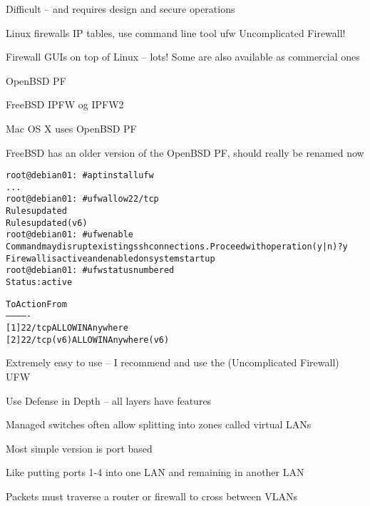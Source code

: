 \documentclass[Screen16to9,17pt]{foils}
\begin{document}
\vskip 5mm
\centerline{Difficult -- and requires design and secure operations}



\begin{list2}
\item Linux firewalls IP tables, use command line tool ufw Uncomplicated Firewall!
\item Firewall GUIs on top of Linux -- lots! Some are also available as commercial ones
\item OpenBSD PF
\item FreeBSD IPFW og IPFW2 
\item Mac OS X uses OpenBSD PF
\item FreeBSD has an older version of the OpenBSD PF, should really be renamed now
\end{list2}




\begin{alltt}\small
root@debian01:~# apt install ufw
...
root@debian01:~# ufw allow 22/tcp
Rules updated
Rules updated (v6)
root@debian01:~# ufw enable
Command may disrupt existing ssh connections. Proceed with operation (y|n)? y
Firewall is active and enabled on system startup
root@debian01:~# ufw status numbered
Status: active

     To                         Action      From
     --                         ------      ----
[ 1] 22/tcp                     ALLOW IN    Anywhere
[ 2] 22/tcp (v6)                ALLOW IN    Anywhere (v6)
\end{alltt}

\begin{list2}
\item Extremely easy to use -- I recommend and use the (Uncomplicated Firewall) UFW
\end{list2}





\centerline{Use Defense in Depth -- all layers have features}




\begin{list1}
\item Managed switches often allow splitting into zones called virtual LANs
\item Most simple version is port based
\item Like putting ports 1-4 into one LAN and remaining in another LAN
\item Packets must traverse a router or firewall to cross between VLANs
\end{list1}
\end{document}
